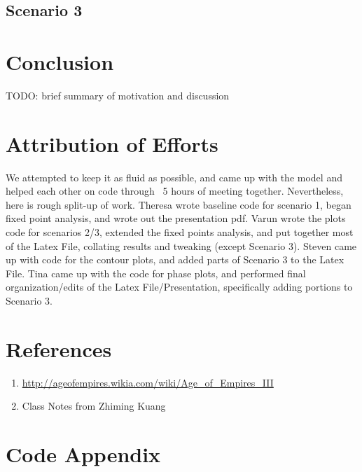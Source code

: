 \documentclass[12pt]{article}
\begin{document}
\subsection{Scenario 3}

\section{Conclusion} 
TODO: brief summary of motivation and discussion

\section{Attribution of Efforts} 
We attempted to keep it as fluid as possible, and came up with the model and helped each other on code through ~5 hours of meeting together. Nevertheless, here is rough split-up of work. Theresa wrote baseline code for scenario 1, began fixed point analysis, and wrote out the presentation pdf. Varun wrote the plots code for scenarios 2/3, extended the fixed points analysis, and put together most of the Latex File, collating results and tweaking (except Scenario 3). Steven came up with code for the contour plots, and added parts of Scenario 3 to the Latex File. Tina came up with the code for phase plots, and performed final organization/edits of the Latex File/Presentation, specifically adding portions to Scenario 3.

\section{References} 
\begin{enumerate}
\item \url{http://ageofempires.wikia.com/wiki/Age_of_Empires_III}
\item Class Notes from Zhiming Kuang
\end{enumerate}

\section{Code Appendix} 
\end{document}
